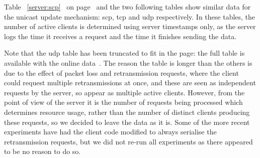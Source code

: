 \documentclass[a4paper,11pt,twocolumn]{article}
\newcommand{\TODO}[1]{\par\noindent%
\hspace*{\fill}%
\framebox{\parbox{0.9\linewidth}{{\bf TODO: }#1}}%
\hspace*{\fill}%
}
\newcommand{\pref}[1]{%
\ref{#1}%
\ifnum\thepage=0\pageref{#1}\else\ on page~\pageref{#1}\fi%
}
\begin{document}
Table~\pref{server:scp} and the two following tables show similar data
for the unicast update mechanism: scp, tcp and udp respectively. In
these tables, the number of active clients is determined using server
timestamps only, as the server logs the time it receives a request and
the time it finishes sending the data.

\TODO{Show graphs}

Note that the udp table has been truncated to fit in the page: the full
table is available with the online data~\cite{data}.  The reason the
table is longer than the others is due to the effect of packet loss
and retransmission requests, where the client could request multiple
retransmissions at once, and these are seen as independent requests by
the server, so appear as multiple active clients. However, from the point
of view of the server it is the number of requests being processed which
determines resource usage, rather than the number of distinct clients
producing these requests, so we decided to leave the data as it is.
Some of the more recent experiments have had the client code modified
to always serialise the retransmission requests, but we did not re-run
all experiments as there appeared to be no reason to do so.
\end{document}
